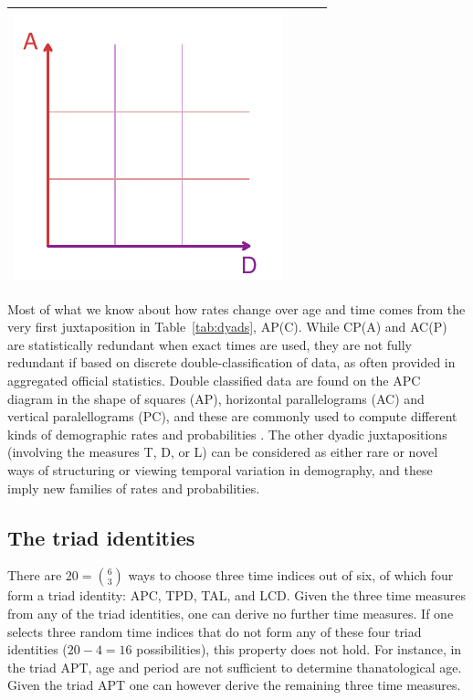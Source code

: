 \documentclass[12pt,oneside,a4paper]{article} %
\begin{document}
\begin{longtable}{m{}L{0.37\textwidth}m{0.17\textwidth}m{0.2\textwidth}}
  \includegraphics[scale=.5]{Figures/DiagramTable/AD_rt.pdf}  \\
  \bottomrule
\end{longtable}

Most of what we know about how rates change over age and time comes
from the very first juxtaposition in Table~\ref{tab:dyads}, AP(C). While
CP(A) and AC(P) are statistically redundant when exact times are used, they
are not fully redundant if based on discrete double-classification of data, as
often provided in aggregated official statistics. Double classified data are
found on the APC diagram in the shape of squares (AP), horizontal parallelograms
(AC) and vertical paralellograms (PC), and
these are commonly used to compute different kinds of demographic
rates and probabilities \citep[][p63]{caselli2005demography}. The other dyadic
juxtapositions (involving the measures T, D, or L) can be considered as either
rare or novel ways of structuring or viewing temporal variation in demography,
and these imply new families of rates and probabilities.

\subsection{The triad identities}
There are $20=\binom{6}{3}$ ways to choose three time indices out of
six, of which four form a triad identity: APC, TPD, TAL, and LCD.
Given the three time measures from any of the
triad identities, one can derive no further time measures. If one selects three
random time indices that do not form any of these four triad identities
($20-4=16$ possibilities), this property does not hold. For instance, in the
triad APT, age and period are not sufficient to determine thanatological age.
Given the triad APT one can however derive the remaining three time
measures.%
\end{document}
